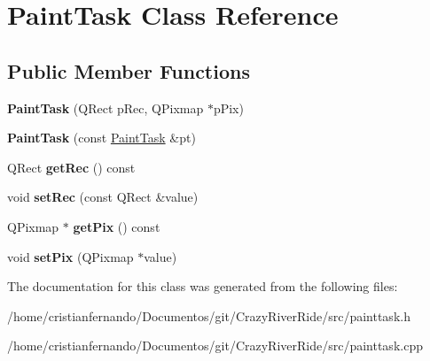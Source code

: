 \hypertarget{class_paint_task}{\section{Paint\-Task Class Reference}
\label{class_paint_task}
}
\subsection*{Public Member Functions}
\begin{DoxyCompactItemize}
\item 
\hypertarget{class_paint_task_a95c518e8d1f1b47513fcbb7d33efae92}{{\bfseries Paint\-Task} (Q\-Rect p\-Rec, Q\-Pixmap $\ast$p\-Pix)}\label{class_paint_task_a95c518e8d1f1b47513fcbb7d33efae92}

\item 
\hypertarget{class_paint_task_aa6a868686cea358b91056a7bdd17c39c}{{\bfseries Paint\-Task} (const \hyperlink{class_paint_task}{Paint\-Task} \&pt)}\label{class_paint_task_aa6a868686cea358b91056a7bdd17c39c}

\item 
\hypertarget{class_paint_task_a2cfc517eefcaf5190c3c138402edf24a}{Q\-Rect {\bfseries get\-Rec} () const }\label{class_paint_task_a2cfc517eefcaf5190c3c138402edf24a}

\item 
\hypertarget{class_paint_task_a589af1cb82beb781e4cc34027f73bdf0}{void {\bfseries set\-Rec} (const Q\-Rect \&value)}\label{class_paint_task_a589af1cb82beb781e4cc34027f73bdf0}

\item 
\hypertarget{class_paint_task_ad32c94ebc7a9b5640179ccbf00a0398e}{Q\-Pixmap $\ast$ {\bfseries get\-Pix} () const }\label{class_paint_task_ad32c94ebc7a9b5640179ccbf00a0398e}

\item 
\hypertarget{class_paint_task_aba6f4430d04a3202950719145f89597c}{void {\bfseries set\-Pix} (Q\-Pixmap $\ast$value)}\label{class_paint_task_aba6f4430d04a3202950719145f89597c}

\end{DoxyCompactItemize}


The documentation for this class was generated from the following files\-:\begin{DoxyCompactItemize}
\item 
/home/cristianfernando/\-Documentos/git/\-Crazy\-River\-Ride/src/painttask.\-h\item 
/home/cristianfernando/\-Documentos/git/\-Crazy\-River\-Ride/src/painttask.\-cpp\end{DoxyCompactItemize}

